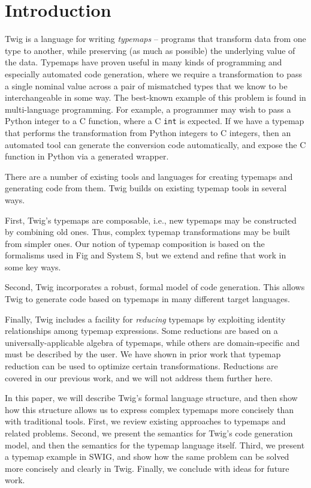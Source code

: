 
\section{Introduction}

Twig is a language for writing \emph{typemaps} -- programs that transform data from one type to another, while preserving (as much as possible) the underlying value of the data. Typemaps have proven useful in many kinds of programming and especially automated code generation, where we require a transformation to pass a single nominal value across a pair of mismatched types that we know to be interchangeable in some way. The best-known example of this problem is found in multi-language programming. For example, a programmer may wish to pass a Python integer to a C function, where a C \texttt{int} is expected. If we have a typemap that performs the transformation from Python integers to C integers, then an automated tool can generate the conversion code automatically, and expose the C function in Python via a generated wrapper.

There are a number of existing tools and languages for creating typemaps and generating code from them. Twig builds on existing typemap tools in several ways.

First, Twig's typemaps are composable, i.e., new typemaps may be constructed by combining old ones. Thus, complex typemap transformations may be built from simpler ones. Our notion of typemap composition is based on the formalisms used in Fig\cite{fig} and System S\cite{system-s}, but we extend and refine that work in some key ways.

Second, Twig incorporates a robust, formal model of code generation. This allows Twig to generate code based on typemaps in many different target languages.

Finally, Twig includes a facility for \emph{reducing} typemaps by exploiting identity relationships among typemap expressions. Some reductions are based on a universally-applicable algebra of typemaps, while others are domain-specific and must be described by the user. We have shown in prior work that typemap reduction can be used to optimize certain transformations. Reductions are covered in our previous work, and we will not address them further here.

In this paper, we will describe Twig's formal language structure, and then show how this structure allows us to express complex typemaps more concisely than with traditional tools. First, we review existing approaches to typemaps and related problems. Second, we present the semantics for Twig's code generation model, and then the semantics for the typemap language itself. Third, we present a typemap example in SWIG, and show how the same problem can be solved more concisely and clearly in Twig. Finally, we conclude with ideas for future work.
